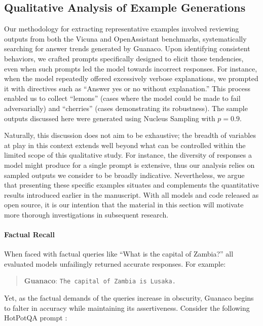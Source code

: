 \subsection{Qualitative Analysis of Example Generations}
\label{ssec:examples}

Our methodology for extracting representative examples involved reviewing outputs from both the Vicuna and OpenAssistant benchmarks, systematically searching for answer trends generated by {Guanaco}. Upon identifying consistent behaviors, we crafted prompts specifically designed to elicit those tendencies, even when such prompts led the model towards incorrect responses. For instance, when the model repeatedly offered excessively verbose explanations, we prompted it with directives such as “Answer yes or no without explanation.” This process enabled us to collect “lemons” (cases where the model could be made to fail adversarially) and “cherries” (cases demonstrating its robustness). The sample outputs discussed here were generated using Nucleus Sampling \cite{holtzmancurious} with $p=0.9$.

Naturally, this discussion does not aim to be exhaustive; the breadth of variables at play in this context extends well beyond what can be controlled within the limited scope of this qualitative study. For instance, the diversity of responses a model might produce for a single prompt is extensive, thus our analysis relies on sampled outputs we consider to be broadly indicative. Nevertheless, we argue that presenting these specific examples situates and complements the quantitative results introduced earlier in the manuscript. With all models and code released as open source, it is our intention that the material in this section will motivate more thorough investigations in subsequent research.

\paragraph{Factual Recall} When faced with factual queries like ``What is the capital of Zambia?'' all evaluated models unfailingly returned accurate responses. For example:

\begin{quote} 
    \textbf{Guanaco}:
    \texttt{The capital of Zambia is Lusaka.}
\end{quote}

Yet, as the factual demands of the queries increase in obscurity, {Guanaco} begins to falter in accuracy while maintaining its assertiveness. Consider the following HotPotQA prompt \citep{yang2018hotpotqa}:

